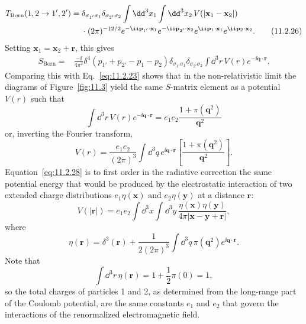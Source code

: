 \begin{align}
  T_{\mathrm{Born}}(1,2\to1',2')={}&
  \delta_{\sigma_{1'}\sigma_1}\delta_{\sigma_{2'}\sigma_2}
  \int \dd^3x_1\int \dd^3x_2\,V(|\mathbf x_1-\mathbf x_2|)\notag\\
  &\cdot(2\pi)^{-12/2}e^{-\ii\mathbf p_{1'}\cdot\mathbf x_1}
  e^{-\ii\mathbf p_{2'}\cdot\mathbf x_2}
  e^{\ii\mathbf p_1\cdot\mathbf x_1}e^{\ii\mathbf p_2\cdot\mathbf x_2}.
  \tag{11.2.26}\label{eq:11.2.26}
\end{align}
Setting $\mathbf x_1=\mathbf x_2+\mathbf r$, this gives
\begin{align}
  S_{\mathrm{Born}}={}&\frac{-\ii}{4\pi^2}
  \delta^4(p_{1'}+p_{2'}-p_1-p_2)
  \delta_{\sigma_{1'}\sigma_1}\delta_{\sigma_{2'}\sigma_2}
  \int \dd^3r\,V(r)e^{-\ii\mathbf q\cdot\mathbf r}.
  \tag{11.2.27}\label{eq:11.2.27}
\end{align}
Comparing this with Eq.~\eqref{eq:11.2.23} shows that in the non-relativistic limit
the diagrams of Figure~\ref{fig:11.3} yield the same $S$-matrix element as a potential
$V(r)$ such that
\[
  \int \dd^3r\,V(r)e^{-\ii\mathbf q\cdot\mathbf r}
  =e_1e_2\frac{1+\pi(\mathbf q^2)}{\mathbf q^2}
\]
or, inverting the Fourier transform,
\begin{equation}
  V(r)=\frac{e_1e_2}{(2\pi)^3}\int \dd^3q\,e^{\ii\mathbf q\cdot\mathbf r}
  \left[\frac{1+\pi(\mathbf q^2)}{\mathbf q^2}\right].
  \tag{11.2.28}\label{eq:11.2.28}
\end{equation}
Equation~\eqref{eq:11.2.28} is to first order in the radiative correction the same
potential energy that would be produced by the electrostatic interaction of
two extended charge distributions $e_1\eta(\mathbf x)$ and
$e_2\eta(\mathbf y)$ at a distance $\mathbf r$:
\begin{equation}
  V(|\mathbf r|)=e_1e_2\int \dd^3x\int \dd^3y\,
  \frac{\eta(\mathbf x)\eta(\mathbf y)}{4\pi|\mathbf x-\mathbf y+\mathbf r|},
  \tag{11.2.29}\label{eq:11.2.29}
\end{equation}
where
\begin{equation}
  \eta(\mathbf r)=\delta^3(\mathbf r)+\frac1{2(2\pi)^3}
  \int \dd^3q\,\pi(\mathbf q^2)e^{\ii\mathbf q\cdot\mathbf r}.
  \tag{11.2.30}\label{eq:11.2.30}
\end{equation}
Note that
\begin{equation}
  \int \dd^3r\,\eta(\mathbf r)=1+\frac12\pi(0)=1,
  \tag{11.2.31}\label{eq:11.2.31}
\end{equation}
so the total charges of particles 1 and 2, as determined from the long-range
part of the Coulomb potential, are the same constants $e_1$ and $e_2$ that
govern the interactions of the renormalized electromagnetic field.

